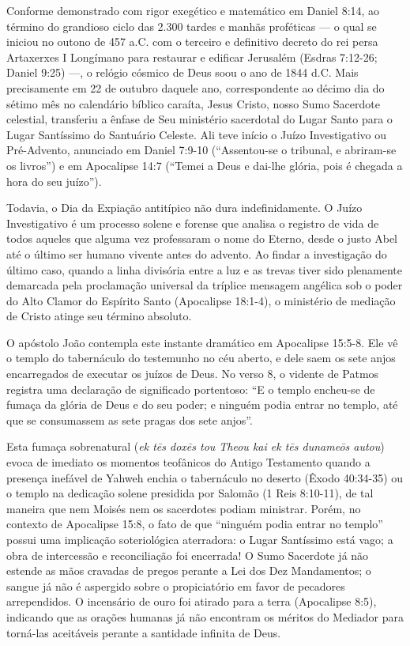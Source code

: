 Conforme demonstrado com rigor exegético e matemático em Daniel 8:14, ao término do grandioso ciclo das 2.300 tardes e manhãs proféticas — o qual se iniciou no outono de 457 a.C. com o terceiro e definitivo decreto do rei persa Artaxerxes I Longímano para restaurar e edificar Jerusalém (Esdras 7:12-26; Daniel 9:25) —, o relógio cósmico de Deus soou o ano de 1844 d.C. Mais precisamente em 22 de outubro daquele ano, correspondente ao décimo dia do sétimo mês no calendário bíblico caraíta, Jesus Cristo, nosso Sumo Sacerdote celestial, transferiu a ênfase de Seu ministério sacerdotal do Lugar Santo para o Lugar Santíssimo do Santuário Celeste. Ali teve início o Juízo Investigativo ou Pré-Advento, anunciado em Daniel 7:9-10 (``Assentou-se o tribunal, e abriram-se os livros'') e em Apocalipse 14:7 (``Temei a Deus e dai-lhe glória, pois é chegada a hora do seu juízo'').

Todavia, o Dia da Expiação antitípico não dura indefinidamente. O Juízo Investigativo é um processo solene e forense que analisa o registro de vida de todos aqueles que alguma vez professaram o nome do Eterno, desde o justo Abel até o último ser humano vivente antes do advento. Ao findar a investigação do último caso, quando a linha divisória entre a luz e as trevas tiver sido plenamente demarcada pela proclamação universal da tríplice mensagem angélica sob o poder do Alto Clamor do Espírito Santo (Apocalipse 18:1-4), o ministério de mediação de Cristo atinge seu término absoluto.

O apóstolo João contempla este instante dramático em Apocalipse 15:5-8. Ele vê o templo do tabernáculo do testemunho no céu aberto, e dele saem os sete anjos encarregados de executar os juízos de Deus. No verso 8, o vidente de Patmos registra uma declaração de significado portentoso: ``E o templo encheu-se de fumaça da glória de Deus e do seu poder; e ninguém podia entrar no templo, até que se consumassem as sete pragas dos sete anjos''.

Esta fumaça sobrenatural (\textit{ek tēs doxēs tou Theou kai ek tēs dunameōs autou}) evoca de imediato os momentos teofânicos do Antigo Testamento quando a presença inefável de Yahweh enchia o tabernáculo no deserto (Êxodo 40:34-35) ou o templo na dedicação solene presidida por Salomão (1 Reis 8:10-11), de tal maneira que nem Moisés nem os sacerdotes podiam ministrar. Porém, no contexto de Apocalipse 15:8, o fato de que ``ninguém podia entrar no templo'' possui uma implicação soteriológica aterradora: o Lugar Santíssimo está vago; a obra de intercessão e reconciliação foi encerrada! O Sumo Sacerdote já não estende as mãos cravadas de pregos perante a Lei dos Dez Mandamentos; o sangue já não é aspergido sobre o propiciatório em favor de pecadores arrependidos. O incensário de ouro foi atirado para a terra (Apocalipse 8:5), indicando que as orações humanas já não encontram os méritos do Mediador para torná-las aceitáveis perante a santidade infinita de Deus.

